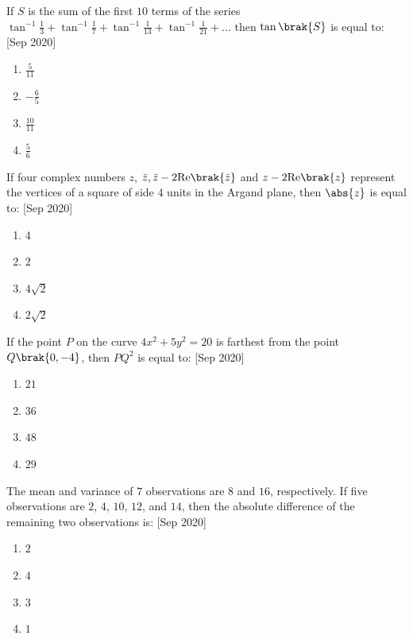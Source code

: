     \item If $S$ is the sum of the first $10$ terms of the series $\tan^{-1} \frac{1}{3} + \tan^{-1} \frac{1}{7} + \tan^{-1} \frac{1}{13} + \tan^{-1} \frac{1}{21} + \dots$ then $\tan\brak{S}$ is equal to:
    \hfill{[Sep 2020]}
    \begin{enumerate}
        \item $\frac{5}{11}$
        \item $-\frac{6}{5}$
        \item $\frac{10}{11}$
        \item $\frac{5}{6}$
    \end{enumerate}

    \item If four complex numbers $z$, $\bar{z},\bar{z} - 2 \text{Re}\brak{\bar{z}}$ and $z - 2 \text{Re}\brak{z}$ represent the vertices of a square of side $4$ units in the Argand plane, then $\abs{z}$ is equal to:
    \hfill{[Sep 2020]}
    \begin{enumerate}
        \item $4$
        \item $2$
        \item $4\sqrt{2}$
        \item $2\sqrt{2}$
    \end{enumerate}

    \item If the point $P$ on the curve $4x^2 + 5y^2 = 20$ is farthest from the point $Q\brak{0, -4}$, then $PQ^2$ is equal to:
    \hfill{[Sep 2020]}
    \begin{enumerate}
        \item $21$
        \item $36$
        \item $48$
        \item $29$
    \end{enumerate}

    \item The mean and variance of $7$ observations are $8$ and $16$, respectively. If five observations are $2$, $4$, $10$, $12$, and $14$, then the absolute difference of the remaining two observations is:
    \hfill{[Sep 2020]}
    \begin{enumerate}
        \item $2$
        \item $4$
        \item $3$
        \item $1$
    \end{enumerate}



